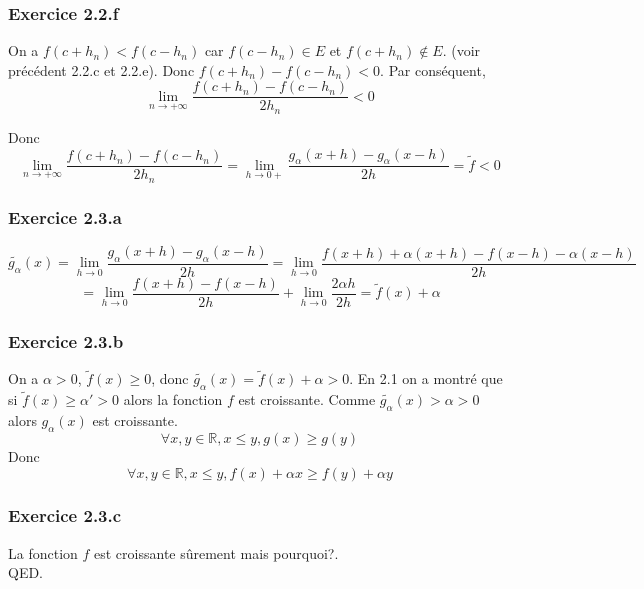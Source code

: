 \documentclass[]{book}
\theoremstyle{definition}
\newcommand{\bb}[1]{\mathbb{#1}}
\newcommand{\R}{\bb{R}}
\begin{document}
\subsubsection*{Exercice 2.2.f}
On a $f(c+h_n) < f(c-h_n)$ car $f(c-h_n) \in E$ et $f(c+h_n) \notin E$. (voir pr\'ec\'edent 2.2.c et 2.2.e). Donc $f(c+h_n)- f(c-h_n) < 0$. Par cons\'equent, 
$$\lim_{n \to +\infty} \frac{f(c+h_n)- f(c-h_n)}{2h_n} < 0$$

Donc
$$ \lim_{n \to +\infty} \frac{f(c+h_n)- f(c-h_n)}{2h_n} =
\lim_{h \to 0+} \frac{g_\alpha(x+h)- g_\alpha(x-h)}{2h} = \tilde{f} < 0$$


\subsubsection*{Exercice 2.3.a}
$$\tilde{g_\alpha}(x) = \lim_{h \to 0} \frac{g_\alpha(x+h)- g_\alpha(x-h)}{2h} = \lim_{h \to 0} \frac{f(x+h) + \alpha (x+h)  - f(x-h) - \alpha (x-h)}{2h}$$
$$=\lim_{h \to 0} \frac{f(x+h) - f(x-h)}{2h} + \lim_{h \to 0} \frac{2 \alpha h}{2h} = \tilde{f}(x) + \alpha$$

\subsubsection*{Exercice 2.3.b}
On a $\alpha > 0$, $\tilde{f}(x) \geq 0$, donc  $\tilde{g_\alpha}(x) = \tilde{f}(x) + \alpha > 0$. En 2.1 on a montr\'e que si $\tilde{f}(x) \geq \alpha' > 0$ alors la fonction $f$ est croissante. Comme $\tilde{g_\alpha}(x) > \alpha > 0$ alors $g_{\alpha}(x)$ est croissante. 
$$\forall x, y \in \R, x \leq y, g(x) \geq g(y)$$
Donc
$$\forall x, y \in \R, x \leq y, f(x) + \alpha x \geq f(y) + \alpha y$$

\subsubsection*{Exercice 2.3.c}

La fonction $f	$ est croissante s\^urement mais pourquoi?.\\

QED.
\end{document}
